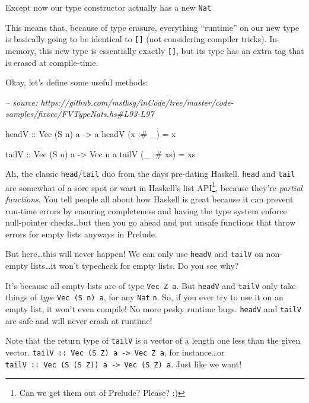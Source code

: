 \documentclass[]{article}
\newenvironment{Shaded}{}{}
\newcommand{\CommentTok}[1]{\textcolor[rgb]{0.38,0.63,0.69}{\textit{#1}}}
\newcommand{\DataTypeTok}[1]{\textcolor[rgb]{0.56,0.13,0.00}{#1}}
\newcommand{\FunctionTok}[1]{\textcolor[rgb]{0.02,0.16,0.49}{#1}}
\newcommand{\NormalTok}[1]{#1}
\newcommand{\OtherTok}[1]{\textcolor[rgb]{0.00,0.44,0.13}{#1}}
\begin{document}
Except now our type constructor actually has a new \texttt{Nat}

This means that, because of type erasure, everything ``runtime'' on our new type
is basically going to be identical to \texttt{{[}{]}} (not considering compiler
tricks). In-memory, this new type is essentially exactly \texttt{{[}{]}}, but
its type has an extra tag that is erased at compile-time.

Okay, let's define some useful methods:

\begin{Shaded}
\begin{Highlighting}[]
\CommentTok{-- source: https://github.com/mstksg/inCode/tree/master/code-samples/fixvec/FVTypeNats.hs#L93-L97}

\OtherTok{headV ::} \DataTypeTok{Vec}\NormalTok{ (}\DataTypeTok{S}\NormalTok{ n) a }\OtherTok{->}\NormalTok{ a}
\NormalTok{headV (x }\FunctionTok{:#}\NormalTok{ _)  }\FunctionTok{=}\NormalTok{ x}

\OtherTok{tailV ::} \DataTypeTok{Vec}\NormalTok{ (}\DataTypeTok{S}\NormalTok{ n) a }\OtherTok{->} \DataTypeTok{Vec}\NormalTok{ n a}
\NormalTok{tailV (_ }\FunctionTok{:#}\NormalTok{ xs) }\FunctionTok{=}\NormalTok{ xs}
\end{Highlighting}
\end{Shaded}

Ah, the classic \texttt{head}/\texttt{tail} duo from the days pre-dating
Haskell. \texttt{head} and \texttt{tail} are somewhat of a sore spot or wart in
Haskell's list API\footnote{Can we get them out of Prelude? Please? :)}, because
they're \emph{partial functions}. You tell people all about how Haskell is great
because it can prevent run-time errors by ensuring completeness and having the
type system enforce null-pointer checks\ldots{}but then you go ahead and put
unsafe functions that throw errors for empty lists anyways in Prelude.

But here\ldots{}this will never happen! We can only use \texttt{headV} and
\texttt{tailV} on non-empty lists\ldots{}it won't typecheck for empty lists. Do
you see why?

It's because all empty lists are of type \texttt{Vec\ Z\ a}. But \texttt{headV}
and \texttt{tailV} only take things of \emph{type} \texttt{Vec\ (S\ n)\ a}, for
any \texttt{Nat} \texttt{n}. So, if you ever try to use it on an empty list, it
won't even compile! No more pesky runtime bugs. \texttt{headV} and
\texttt{tailV} are safe and will never crash at runtime!

Note that the return type of \texttt{tailV} is a vector of a length one less
than the given vector.
\texttt{tailV\ ::\ Vec\ (S\ Z)\ a\ -\textgreater{}\ Vec\ Z\ a}, for
instance\ldots{}or
\texttt{tailV\ ::\ Vec\ (S\ (S\ Z))\ a\ -\textgreater{}\ Vec\ (S\ Z)\ a}. Just
like we want!
\end{document}
